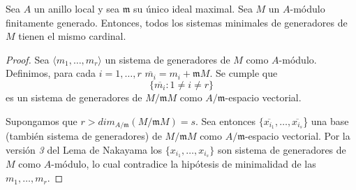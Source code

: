 \documentclass[../main.tex]{subfiles}
\begin{document}
\begin{corollary}
Sea $A$ un anillo local y sea $\mathfrak{m}$ su único ideal maximal. Sea $M$ un $A$-módulo finitamente generado. Entonces, todos los sistemas minimales de generadores de $M$ tienen el mismo cardinal.
\end{corollary}
\begin{proof}
Sea $\langle m_1,\dots,m_r\rangle$ un sistema de generadores de $M$ como $A$-módulo. Definimos, para cada $i=1,\dots,r$ $\overline{m_i}=m_i+\mathfrak{m}M$. Se cumple que $$\{\overline{m_i}:1\neq i\neq r\}$$ es un sistema de generadores de $M/\mathfrak{m}M$ como $A/\mathfrak{m}$-espacio vectorial.

Supongamos que $r>dim_{A/\mathfrak{m}}(M/\mathfrak{m}M)=s$. Sea entonces $\{\overline{x_{i_1}},\dots,\overline{x_{i_s}}$\} una base (también sistema de generadores) de $M/\mathfrak{m}M$ como $A/\mathfrak{m}$-espacio vectorial. Por la versión \textit{3} del Lema de Nakayama los $\{x_{i_1},\dots,x_{i_s}\}$ son sistema de generadores de $M$ como $A$-módulo, lo cual contradice la hipótesis de minimalidad de las $m_1,\dots,m_r$.
\end{proof}
\end{document}
